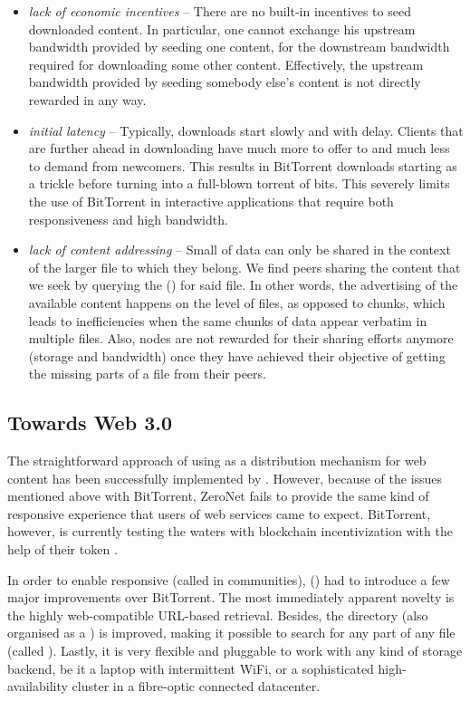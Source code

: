 \begin{itemize}
\item \emph{lack of economic incentives} -- 
There are no built-in incentives to seed downloaded content. In particular, one cannot exchange his upstream bandwidth provided by seeding one content, for the downstream bandwidth required for downloading some other content. Effectively, the upstream bandwidth provided by seeding somebody else's content is not directly rewarded in any way.
\item \emph{initial latency} -- 
 Typically, downloads start slowly and with delay. Clients that are further ahead in downloading have much more to offer to and much less to demand from newcomers. This results in BitTorrent downloads starting as a trickle before turning into a full-blown torrent of bits. This severely limits the use of BitTorrent in interactive applications that require both responsiveness and high bandwidth.
\item \emph{lack of content addressing} -- Small  of data can only be shared in the context of the larger file to which they belong. We find peers sharing the content that we seek by querying the  () for said file. In other words, the advertising of the available content happens on the level of files, as opposed to chunks, which leads to inefficiencies when the same chunks of data appear verbatim in multiple files. Also, nodes are not rewarded for their sharing efforts anymore (storage and bandwidth) once they have achieved their objective of getting the missing parts of a file from their peers.

\end{itemize}

\subsection{Towards Web 3.0}\label{sec:towards-web3}

The straightforward approach of using  as a distribution mechanism for web content has been successfully implemented by  \cite{zeronet}. However, because of the issues mentioned above with BitTorrent, ZeroNet fails to provide the same kind of responsive experience that users of web services came to expect. BitTorrent, however, is currently testing the waters with blockchain incentivization with the help of their token \cite{tron}.

In order to enable responsive  (called  in  communities),  () \cite{ipfs2014} had to introduce a few major improvements over BitTorrent. The most immediately apparent novelty is the highly web-compatible URL-based retrieval. Besides, the directory (also organised as a ) is improved, making it possible to search for any part of any file (called ). Lastly, it is very flexible and pluggable to work with any kind of storage backend, be it a laptop with intermittent WiFi, or a sophisticated high-availability cluster in a fibre-optic connected datacenter.

